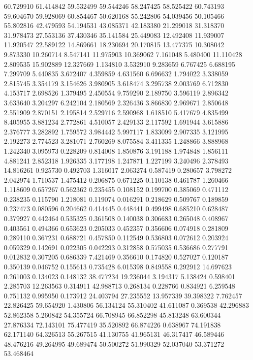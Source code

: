 60.729910
61.414842
59.532499
59.544246
58.247425
58.525422
60.743193
59.604670
59.928069
60.854467
50.620168
55.242806
54.039456
50.105466
55.802816
42.479593
54.194531
43.085371
42.183380
21.299018
31.318370
31.978473
27.553136
37.430346
35.141584
25.449083
12.492408
11.939007
11.920547
22.589122
14.869661
18.230694
20.170815
13.477375
10.308042
9.873330
10.260714
8.547141
11.975903
10.369062
7.161048
5.480400
11.110428
2.809535
15.902889
12.327669
1.134810
3.532910
9.283659
6.767425
6.688195
7.299709
5.440835
3.672407
4.359859
4.631560
6.696632
1.794022
3.338059
2.815745
3.354179
3.154626
3.980905
3.618474
3.295738
2.003769
6.712830
4.153717
2.698526
1.379495
2.450554
9.759290
2.189750
3.596119
2.896342
3.633640
3.204297
6.242104
2.180569
2.326436
3.866830
2.969671
2.850648
2.551909
2.870151
2.195814
2.529716
2.590968
1.618510
5.417679
4.835499
8.405955
3.881234
2.772861
4.510057
2.429133
2.117592
1.691944
3.615886
2.376777
3.282892
1.759572
3.984442
5.997117
1.833099
2.907335
3.121995
2.192273
2.774523
3.281071
2.760269
8.075584
3.411335
1.248866
3.888968
1.242340
3.095973
0.228209
0.814008
1.850876
3.191188
1.974848
1.856111
4.881241
2.852318
1.926335
3.177198
1.247871
1.227199
3.240496
2.378493
14.816261
0.925730
0.492703
1.316017
2.063274
0.587419
0.280657
3.798272
2.042974
1.710537
1.475412
0.206875
0.671225
0.110138
0.461787
1.260466
1.118609
0.657267
0.562362
0.235455
0.108152
0.199700
0.385069
0.471112
0.238235
0.115790
1.218081
0.119074
0.016291
0.218629
0.509767
0.189859
0.237473
0.080596
0.204662
0.414445
0.448441
0.499498
0.685210
0.628487
0.379927
0.442464
0.535325
0.361508
0.140038
0.306683
0.265048
0.408967
0.403561
0.494366
0.653623
0.205033
0.452357
0.356606
0.074918
0.281809
0.289110
0.367231
0.688721
0.457850
0.112549
0.536803
0.072612
0.203924
0.059329
0.142691
0.022305
0.042293
0.312858
0.575035
0.536686
0.277791
0.012832
0.307205
0.686339
7.421469
0.356610
0.174820
0.527027
0.120187
0.350139
0.046752
0.155613
0.735428
6.015398
0.849558
0.292912
14.697623
0.261003
0.134023
0.148132
38.477234
19.236044
3.194317
5.138424
0.598401
2.285703
12.263563
0.314911
42.988713
0.268134
0.228766
0.834921
6.259548
0.751132
0.995950
0.173912
24.403794
27.235552
13.957339
39.398322
7.762457
22.826425
59.654920
1.430806
56.134124
55.310402
41.611087
0.369538
42.296883
52.862358
5.260842
54.355724
66.708945
66.852298
45.813248
63.600344
27.876334
72.143101
75.477419
35.520892
66.874226
0.638967
74.191838
62.171140
64.326513
55.267515
41.130755
41.965131
46.317417
46.589446
48.476216
49.264995
49.689474
50.500272
51.990329
52.037040
53.371272
53.468464
